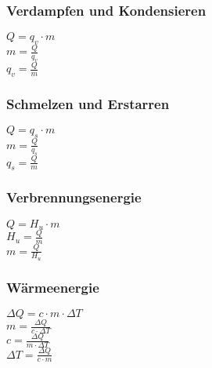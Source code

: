 \subsubsection{Verdampfen und Kondensieren} 
\begin{minipage}{0.45\textwidth} 
$ Q =q_{v} \cdot m $\\ 
$ m = \frac{Q}{q_{v} } $\\ 
$ q_{v}  = \frac{Q}{m} $\\ 
\end{minipage} 
\begin{minipage}{0.45\textwidth} 
 
\end{minipage} 
\subsubsection{Schmelzen und Erstarren} 
\begin{minipage}{0.45\textwidth} 
$ Q = q_{s} \cdot m $\\ 
$ m = \frac{Q}{q_{s} } $\\ 
$ q_{s}  = \frac{Q}{m} $\\ 
\end{minipage} 
\begin{minipage}{0.45\textwidth} 
 
\end{minipage} 
\subsubsection{Verbrennungsenergie} 
\begin{minipage}{0.45\textwidth} 
$ Q = H_{u} \cdot m $\\ 
$ H_{u}  = \frac{Q}{m} $\\ 
$ m = \frac{Q}{H_{u} } $\\ 
\end{minipage} 
\begin{minipage}{0.45\textwidth} 
 
\end{minipage} 
\subsubsection{Wärmeenergie} 
\begin{minipage}{0.45\textwidth} 
$ \Delta Q = c\cdot m\cdot \Delta T $\\ 
$ m = \frac{ \Delta Q}{c\cdot \Delta T} $\\ 
$ c = \frac{ \Delta Q}{m\cdot \Delta T} $\\ 
$ \Delta T = \frac{\Delta Q}{c\cdot m} $\\ 
\end{minipage} 
\begin{minipage}{0.45\textwidth} 
 
\end{minipage} 
